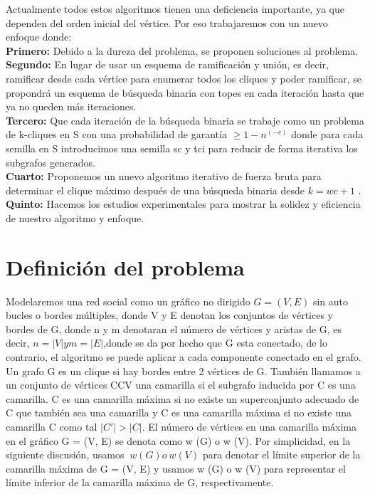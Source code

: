 Actualmente todos estos algoritmos tienen una deficiencia importante, ya que dependen del orden inicial del vértice. Por eso trabajaremos con un nuevo enfoque donde:
\\
\textbf{Primero:} Debido a la dureza del problema, se proponen soluciones al problema.
\\
\textbf{Segundo:} En lugar de usar un esquema de ramificación y unión, es decir, ramificar desde cada vértice para enumerar todos los cliques y poder ramificar, se propondrá un esquema de búsqueda binaria con topes en cada iteración hasta que ya no queden más iteraciones.
\\
\textbf{Tercero:} Que cada iteración de la búsqueda binaria se trabaje como un problema de k-cliques en S con una probabilidad de garantía \begin{math} ≥1-n^(-c) \end{math} donde para cada semilla en S introducimos una semilla sc y tci para reducir de forma iterativa los subgrafos generados. 
\\
\textbf{Cuarto:} Proponemos un nuevo algoritmo iterativo de fuerza bruta para determinar el clique máximo después de una búsqueda binaria desde \begin{math} k = wc + 1  \end{math} . 
\\
\textbf{Quinto:} Hacemos los estudios experimentales para mostrar la solidez y eficiencia de nuestro algoritmo y enfoque.
\\

\section{Definición del problema}

Modelaremos una red social como un gráfico no dirigido \begin{math} G =(V,E) \end{math} 
sin auto bucles o bordes múltiples, donde V y E denotan los conjuntos de vértices y bordes de G, donde n y m denotaran el número de vértices y aristas de G, es decir, \begin{math}
n = |V| y m = |E|
\end{math},donde se da por hecho que G esta conectado, de lo contrario, el algoritmo se puede aplicar a cada componente conectado en el grafo.
\\
Un grafo G es un clique si hay bordes entre 2 vértices de G. También llamamos a un conjunto de vértices CCV una camarilla si el subgrafo inducida por C es una camarilla. C es una camarilla máxima si no existe un superconjunto adecuado de C que también sea una camarilla y C es una camarilla máxima si no existe una camarilla C como tal \begin{math} | C '| > | C | \end{math}. El número de vértices en una camarilla máxima en el gráfico G = (V, E) se denota como w (G) o w (V). Por simplicidad, en la siguiente discusión, usamos \begin{math} ~ w (G) o ~ w (V)\end{math} para denotar el límite superior de la camarilla máxima de G = (V, E) y usamos w (G) o w (V) para representar el límite inferior de la camarilla máxima de G, respectivamente.
\\
